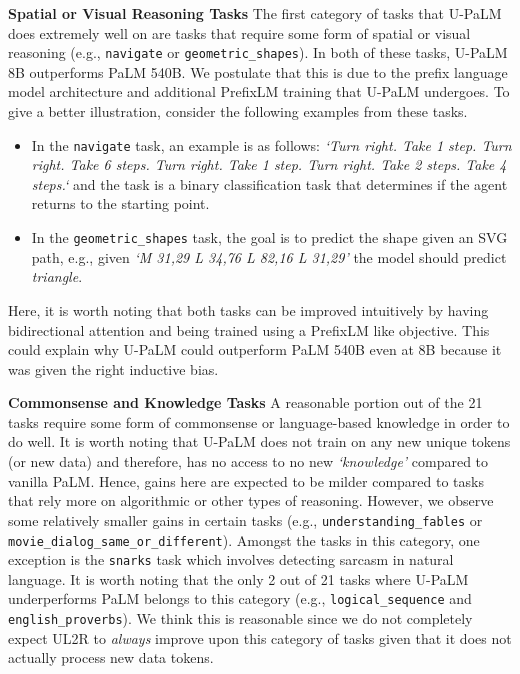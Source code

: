 \documentclass{article}
\newcommand{\methodname}{UL2R\xspace}
\newcommand{\modelname}{U-PaLM\xspace}
\begin{document}
\textbf{Spatial or Visual Reasoning Tasks} The first category of tasks that \modelname does extremely well on are tasks that require some form of spatial or visual reasoning (e.g., \texttt{navigate} or \texttt{geometric\_shapes}). In both of these tasks, \modelname 8B outperforms PaLM 540B. We postulate that this is due to the prefix language model architecture and additional PrefixLM training that \modelname undergoes. To give a better illustration, consider the following examples from these tasks.
\begin{itemize}
\item In the \texttt{navigate} task, an example is as follows: \textit{`Turn right. Take 1 step. Turn right. Take 6 steps. Turn right. Take 1 step. Turn right. Take 2 steps. Take 4 steps.`} and the task is a binary classification task that determines if the agent returns to the starting point.
\item In the \texttt{geometric\_shapes} task, the goal is to predict the shape given an SVG path, e.g., given \textit{`M 31,29 L 34,76 L 82,16 L 31,29'} the model should predict \textit{triangle}.
\end{itemize}
Here, it is worth noting that both tasks can be improved intuitively by having bidirectional attention and being trained using a PrefixLM like objective. This could explain why \modelname could outperform PaLM 540B even at 8B because it was given the right inductive bias.

\textbf{Commonsense and Knowledge Tasks}
A reasonable portion out of the 21 tasks require some form of commonsense or language-based knowledge in order to do well. It is worth noting that \modelname does not train on any new unique tokens (or new data) and therefore, has no access to no new \textit{`knowledge'} compared to vanilla PaLM. Hence, gains here are expected to be milder compared to tasks that rely more on algorithmic or other types of reasoning. However, we observe some relatively smaller gains in certain tasks (e.g., \texttt{understanding\_fables} or \texttt{movie\_dialog\_same\_or\_different}). Amongst the tasks in this category, one exception is the \texttt{snarks} task which involves detecting sarcasm in natural language. It is worth noting that the only 2 out of 21 tasks where \modelname underperforms PaLM belongs to this category (e.g., \texttt{logical\_sequence} and \texttt{english\_proverbs}). We think this is reasonable since we do not completely expect \methodname to \textit{always} improve upon this category of tasks given that it does not actually process new data tokens.
\end{document}
